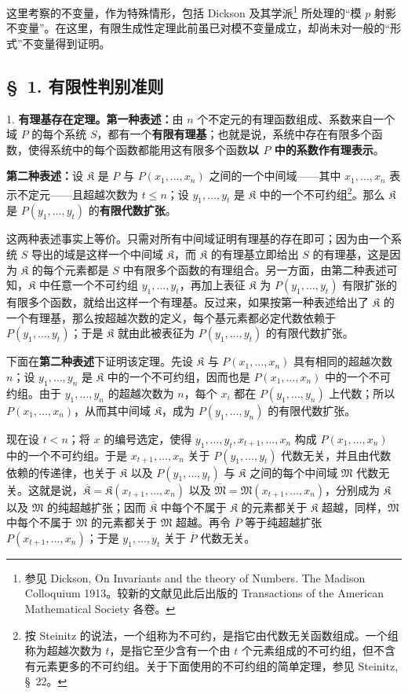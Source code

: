 \documentclass[11pt]{article}
\newcommand{\srcemph}[1]{\textbf{#1}}
\begin{document}
这里考察的不变量，作为特殊情形，包括 Dickson 及其学派\footnote{参见 Dickson, On Invariants and the theory of Numbers. The Madison Colloquium 1913。较新的文献见此后出版的 Transactions of the American Mathematical Society 各卷。} 所处理的“模 $p$ 射影不变量”。在这里，有限生成性定理此前虽已对模不变量成立，却尚未对一般的“形式”不变量得到证明。

\subsection*{\S\ 1. 有限性判别准则}

1. \srcemph{有理基存在定理。第一种表述：}由 $n$ 个不定元的有理函数组成、系数来自一个域 $P$ 的每个系统 $S$，都有一个\srcemph{有限有理基}；也就是说，系统中存在有限多个函数，使得系统中的每个函数都能用这有限多个函数\srcemph{以 $P$ 中的系数作有理表示}。

\srcemph{第二种表述：}设 $\mathfrak K$ 是 $P$ 与 $P(x_1,\ldots,x_n)$ 之间的一个中间域——其中 $x_1,\ldots,x_n$ 表示不定元——且超越次数为 $t\leq n$；设 $y_1,\ldots,y_t$ 是 $\mathfrak K$ 中的一个不可约组\footnote{按 Steinitz 的说法，一个组称为不可约，是指它由代数无关函数组成。一个组称为超越次数为 $t$，是指它至少含有一个由 $t$ 个元素组成的不可约组，但不含有元素更多的不可约组。关于下面使用的不可约组的简单定理，参见 Steinitz, \S\ 22。}。那么 $\mathfrak K$ 是 $P(y_1,\ldots,y_t)$ 的\srcemph{有限代数扩张}。

这两种表述事实上等价。只需对所有中间域证明有理基的存在即可；因为由一个系统 $S$ 导出的域是这样一个中间域 $\mathfrak K$，而 $\mathfrak K$ 的有理基立即给出 $S$ 的有理基，这是因为 $\mathfrak K$ 的每个元素都是 $S$ 中有限多个函数的有理组合。另一方面，由第二种表述可知，$\mathfrak K$ 中任意一个不可约组 $y_1,\ldots,y_t$，再加上表征 $\mathfrak K$ 为 $P(y_1,\ldots,y_t)$ 有限扩张的有限多个函数，就给出这样一个有理基。反过来，如果按第一种表述给出了 $\mathfrak K$ 的一个有理基，那么按超越次数的定义，每个基元素都必定代数依赖于 $P(y_1,\ldots,y_t)$；于是 $\mathfrak K$ 就由此被表征为 $P(y_1,\ldots,y_t)$ 的有限代数扩张。

下面在\srcemph{第二种表述}下证明该定理。先设 $\mathfrak K$ 与 $P(x_1,\ldots,x_n)$ 具有相同的超越次数 $n$；设 $y_1,\ldots,y_n$ 是 $\mathfrak K$ 中的一个不可约组，因而也是 $P(x_1,\ldots,x_n)$ 中的一个不可约组。由于 $y_1,\ldots,y_n$ 的超越次数为 $n$，每个 $x_i$ 都在 $P(y_1,\ldots,y_n)$ 上代数；所以 $P(x_1,\ldots,x_n)$，从而其中间域 $\mathfrak K$，成为 $P(y_1,\ldots,y_n)$ 的有限代数扩张。

现在设 $t<n$；将 $x$ 的编号选定，使得 $y_1,\ldots,y_t,x_{t+1},\ldots,x_n$ 构成 $P(x_1,\ldots,x_n)$ 中的一个不可约组。于是 $x_{t+1},\ldots,x_n$ 关于 $P(y_1,\ldots,y_t)$ 代数无关，并且由代数依赖的传递律，也关于 $\mathfrak K$ 以及 $P(y_1,\ldots,y_t)$ 与 $\mathfrak K$ 之间的每个中间域 $\mathfrak M$ 代数无关。这就是说，$\overline{\mathfrak K}=\mathfrak K(x_{t+1},\ldots,x_n)$ 以及 $\overline{\mathfrak M}=\mathfrak M(x_{t+1},\ldots,x_n)$，分别成为 $\mathfrak K$ 以及 $\mathfrak M$ 的纯超越扩张；因而 $\overline{\mathfrak K}$ 中每个不属于 $\mathfrak K$ 的元素都关于 $\mathfrak K$ 超越，同样，$\overline{\mathfrak M}$ 中每个不属于 $\mathfrak M$ 的元素都关于 $\mathfrak M$ 超越。再令 $\overline P$ 等于纯超越扩张 $P(x_{t+1},\ldots,x_n)$；于是 $y_1,\ldots,y_t$ 关于 $\overline P$ 代数无关。
\end{document}
